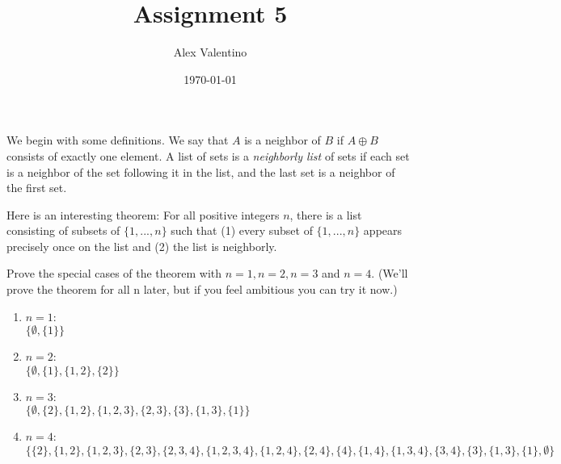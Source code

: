 \documentclass[12pt, letterpaper]{article}
\date{\today}
\author{Alex Valentino}
\title{Assignment 5}
\begin{document}
	We begin with some definitions. We say that $A$ is a neighbor of $B$ if $A \oplus B$ consists of exactly one element.
	\newline
	A list of sets is a \textit{neighborly list} of sets if each set is a neighbor of the set following it in the
list, and the last set is a neighbor of the first set.
	\newline
	
	Here is an interesting theorem: For all positive integers $n$, there is a list consisting of subsets
of $\{1, . . . , n\}$ such that (1) every subset of $\{1, . . . , n\}$ appears precisely once on the list and
(2) the list is neighborly.
\newline

	Prove the special cases of the theorem with $n = 1, n = 2, n = 3$ and $n = 4.$ (We'll prove the
theorem for all n later, but if you feel ambitious you can try it now.)

\begin{enumerate}
	\item $n=1$:\\  
	$\{\emptyset,\{1\}\}$
	\item $n=2$:\\
	$\{\emptyset,\{1\},\{1,2\},\{2\}\}$
	\item $n=3$:\\
	$\{\emptyset,\{2\},\{1,2\},\{1,2,3\},\{2,3\},\{3\},\{1,3\},\{1\}\}$
	\item $n=4$:\\
	$\{\{2\},\{1,2\},\{1,2,3\},\{2,3\},\{2,3,4\},\{1,2,3,4\},\{1,2,4\},\{2,4\},\{4\},\{1,4\},\{1,3,4\},\{3,4\},\{3\},\{1,3\},\{1\},\emptyset\}$
\end{enumerate}
\end{document}
